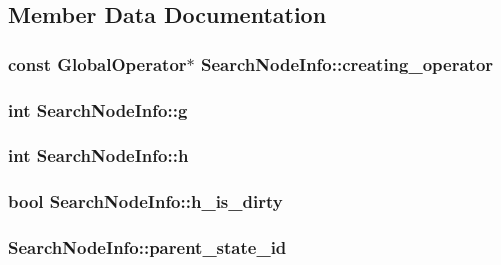 \subsection{Member Data Documentation}
\hypertarget{structSearchNodeInfo_a00ac98dc0a849cdc798a382c992b3494}{
\subsubsection[{creating\-\_\-operator}]{\setlength{\rightskip}{0pt plus 5cm}const {\bf Global\-Operator}$\ast$ Search\-Node\-Info\-::creating\-\_\-operator}}\label{structSearchNodeInfo_a00ac98dc0a849cdc798a382c992b3494}
\hypertarget{structSearchNodeInfo_a822efe4485b26c0f11c42fb85177a03b}{
\subsubsection[{g}]{\setlength{\rightskip}{0pt plus 5cm}int Search\-Node\-Info\-::g}}\label{structSearchNodeInfo_a822efe4485b26c0f11c42fb85177a03b}
\hypertarget{structSearchNodeInfo_afb8e1a40836bac71ccde5e1ff1b63cea}{
\subsubsection[{h}]{\setlength{\rightskip}{0pt plus 5cm}int Search\-Node\-Info\-::h}}\label{structSearchNodeInfo_afb8e1a40836bac71ccde5e1ff1b63cea}
\hypertarget{structSearchNodeInfo_ad39a4374ed651a04b4a580efa601c6a3}{
\subsubsection[{h\-\_\-is\-\_\-dirty}]{\setlength{\rightskip}{0pt plus 5cm}bool Search\-Node\-Info\-::h\-\_\-is\-\_\-dirty}}\label{structSearchNodeInfo_ad39a4374ed651a04b4a580efa601c6a3}
\hypertarget{structSearchNodeInfo_a6d9f3641136126b5e4bcaac4b183aa75}{
\subsubsection[{parent\-\_\-state\-\_\-id}]{ Search\-Node\-Info\-::parent\-\_\-state\-\_\-id}}\label{structSearchNodeInfo_a6d9f3641136126b5e4bcaac4b183aa75}
